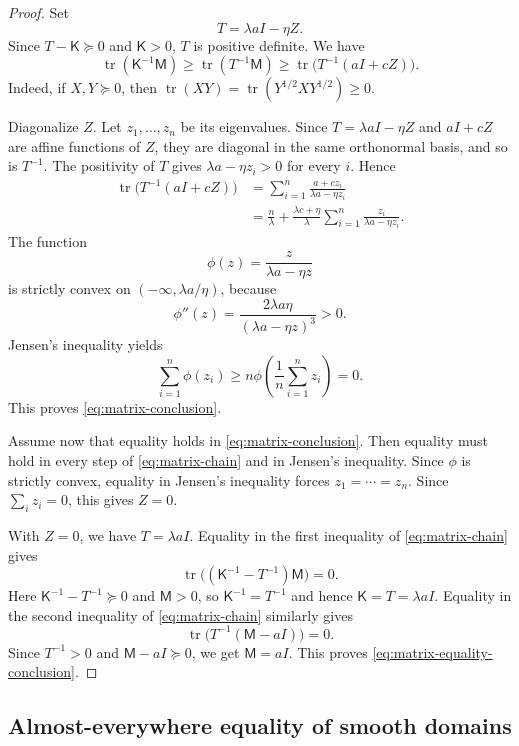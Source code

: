 \documentclass[11pt]{amsart}
\theoremstyle{remark}
\DeclareMathOperator{\tr}{tr}
\newcommand{\Id}{I}
\newcommand{\mcM}{\mathsf M}
\newcommand{\mcK}{\mathsf K}
\begin{document}
\begin{proof}
Set
$$
        T=\lambda a\Id-\eta Z.
$$
Since $T-\mcK\succeq0$ and $\mcK>0$, $T$ is positive definite.
We have
\begin{equation}\label{eq:matrix-chain}
        \tr(\mcK^{-1}\mcM)
        \ge \tr(T^{-1}\mcM)
        \ge \tr\bigl(T^{-1}(a\Id+cZ)\bigr).
\end{equation}
Indeed, if $X,Y\succeq0$, then $\tr(XY)=\tr(Y^{1/2}XY^{1/2})\ge0$.

Diagonalize $Z$.  Let $z_1,\dots,z_n$ be its eigenvalues.  Since $T=\lambda a\Id-\eta Z$ and $a\Id+cZ$ are affine functions of $Z$, they are diagonal in the same orthonormal basis, and so is $T^{-1}$.  
The positivity of $T$ gives $\lambda a-\eta z_i>0$ for every $i$.  Hence
\begin{align*}
        \tr\bigl(T^{-1}(a\Id+cZ)\bigr)
        &=\sum_{i=1}^n\frac{a+cz_i}{\lambda a-\eta z_i}\\
        &=\frac{n}{\lambda}
        +\frac{\lambda c+\eta}{\lambda}
        \sum_{i=1}^n\frac{z_i}{\lambda a-\eta z_i}.
\end{align*}
The function
$$
        \phi(z)=\frac{z}{\lambda a-\eta z}
$$
is strictly convex on $(-\infty,\lambda a/\eta)$, because
$$
        \phi''(z)=\frac{2\lambda a\eta}{(\lambda a-\eta z)^3}>0.
$$
Jensen's inequality yields
$$
        \sum_{i=1}^n\phi(z_i)
        \ge n\phi\left(\frac1n\sum_{i=1}^nz_i\right)=0.
$$
This proves \eqref{eq:matrix-conclusion}.

Assume now that equality holds in \eqref{eq:matrix-conclusion}.  Then equality must hold in every step of \eqref{eq:matrix-chain} and in Jensen's inequality.  Since $\phi$ is strictly convex, equality in Jensen's inequality forces $z_1=\cdots=z_n$.  Since $\sum_i z_i=0$, this gives $Z=0$.

With $Z=0$, we have $T=\lambda a\Id$.  Equality in the first inequality of \eqref{eq:matrix-chain} gives
$$
        \tr\bigl((\mcK^{-1}-T^{-1})\mcM\bigr)=0.
$$
Here $\mcK^{-1}-T^{-1}\succeq0$ and $\mcM>0$, so $\mcK^{-1}=T^{-1}$ and hence $\mcK=T=\lambda a\Id$.  Equality in the second inequality of \eqref{eq:matrix-chain} similarly gives
$$
        \tr\bigl(T^{-1}(\mcM-a\Id)\bigr)=0.
$$
Since $T^{-1}>0$ and $\mcM-a\Id\succeq0$, we get $\mcM=a\Id$.  This proves \eqref{eq:matrix-equality-conclusion}.
\end{proof}



\subsection{Almost-everywhere equality of smooth domains}
\end{document}
